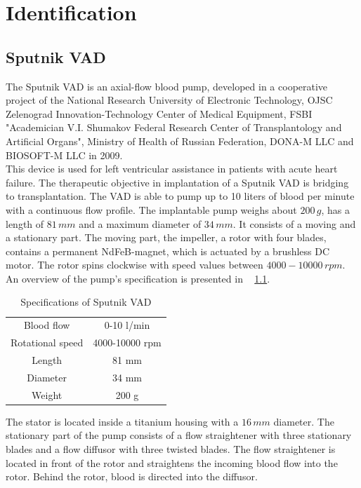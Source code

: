 \chapter{Identification}
\section{Sputnik VAD}\label{Sputnik}
The Sputnik VAD is an axial-flow blood pump, developed in a cooperative project of the National Research University of Electronic Technology, OJSC Zelenograd Innovation-Technology Center of Medical Equipment, FSBI "Academician V.I. Shumakov Federal Research Center of Transplantology and Artificial Organs", Ministry of Health of Russian Federation, DONA-M LLC and BIOSOFT-M LLC in 2009. \cite{Sputnik1}
\\This device is used for left ventricular assistance in patients with acute heart failure. The therapeutic objective in implantation of a Sputnik VAD is bridging to transplantation. The VAD is able to pump up to 10 liters of blood per minute with a continuous flow profile. The implantable pump weighs about $200\, g$, has a length of $81\, mm$ and a maximum diameter of $34\, mm$. It consists of a moving and a stationary part. The moving part, the impeller, a rotor with four blades, contains a permanent NdFeB-magnet, which is actuated by a brushless DC motor. The rotor spins clockwise with speed values between $4000-10000\, rpm$. An overview of the pump's specification is presented in \tablename~ \ref{tab:sput1}.
\begin{table}[ht]
  \centering
  \begin{tabular}{c|c}
    \toprule
    Blood flow  & 0-10 l/min \\
    Rotational speed & 4000-10000 rpm \\
    Length & 81 mm \\
    Diameter & 34 mm \\
    Weight & 200 g \\
    \bottomrule
\end{tabular}
  \caption[Specifications of Sputnik VAD]{Specifications of Sputnik VAD}
  \label{tab:sput1}
\end{table}
The stator is located inside a titanium housing with a $16\, mm$ diameter. The stationary part of the pump consists of a flow straightener with three stationary blades and a flow diffusor with three twisted blades. The flow straightener is located in front of the rotor and straightens the incoming blood flow into the rotor. Behind the rotor, blood is directed into the diffusor. %
